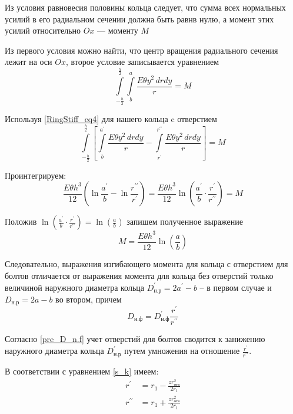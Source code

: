 Из условия равновесия половины кольца следует, что сумма всех нормальных усилий в его радиальном сечении должна быть равнв нулю, а момент этих усилий относительно $Ox$ --- моменту $M$

Из первого условия можно найти, что центр вращения радиального сечения лежит на оси $Ox$, второе условие записывается уравнением
\begin{equation}
  \label{RingStiff_eq4}
  \int\limits_{-\frac{h}{2}}^{\frac{h}{2}} \int\limits_b^a \frac{E \theta y^{2} \,drdy}{r}=M
\end{equation}

Используя \eqref{RingStiff_eq4} для нашего кольца c отверстием 
\begin{equation}
  \int\limits_{-\frac{h}{2}}^{\frac{h}{2}} \left [ \int\limits_{b}^{a^{\prime}} \frac{E \theta y^{2} \,drdy}{r} - \int\limits_{r^{\prime}}^{r^{\prime \prime}} \frac{E \theta y^{2} \,drdy}{r} \right ] = M
\end{equation}

Проинтегрируем:
\begin{equation}
  \frac{E \theta h^{3}}{12} \left ( \ln \frac{a^{\prime}}{b} - \ln \frac{r^{\prime \prime}}{r^{\prime}} \right ) = \frac{E \theta h^{3}}{12} \ln \left ( \frac{a^{\prime}}{b} \cdot \frac{r^{\prime}}{r^{\prime \prime}} \right ) = M
\end{equation}

Положив $\ln \left ( \frac{a^{\prime}}{b} \cdot \frac{r^{\prime}}{r^{\prime \prime}} \right ) = \ln \left ( \frac{a}{b} \right )$ запишем полученное выражение 
\begin{equation}
  M= \frac{E \theta h^{3}}{12} \ln \left ( \frac{a}{b} \right )
\end{equation}

Следовательно, выражения изгибающего момента для кольца с отверстием для болтов отличается от выражения момента для кольца без отверстий только величиной наружного диаметра кольца $D_{\text{н.р}}^{\prime} = 2a^{\prime}-b$ -- в первом случае и $D_{\text{н.р}} = 2a-b$ во втором, причем
\begin{equation}
  \label{pre_D_n.f}
  D_{\text{н.ф}} = D_{\text{н.ф}}^{\prime} \frac{r^{\prime}}{r^{\prime \prime}} 
\end{equation}

Согласно \eqref{pre_D_n.f} учет отверстий для болтов сводится к занижению наружного диаметра кольца $D_{\text{н.р}}^{\prime}$ путем умножения на отношение $\frac{r^{\prime}}{r^{\prime \prime}}$.

В соответствии с уравнением \eqref{s_k} имеем:
\begin{equation}
  \label{r',r''}
    \begin{split}
        r^{\prime} & = r_{1} - \frac{z r_{\text{отв}}^{2}}{2r_{1}} \\
        r^{\prime \prime} & = r_{1} + \frac{z r_{\text{отв}}^{2}}{2r_{1}}
    \end{split}
\end{equation}

